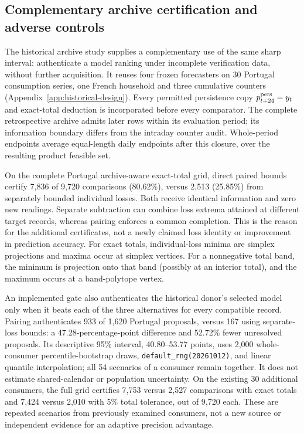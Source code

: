 \subsection{Complementary archive certification and adverse controls}
\label{sec:historical-application}
The historical archive study supplies a complementary use of the same
sharp interval: authenticate a model ranking under incomplete verification
data, without further acquisition. It reuses four frozen forecasters on
30 Portugal consumption series, one French household and three cumulative
counters (Appendix~\ref{app:historical-design}). Every permitted persistence
copy $p^{\rm pers}_{t+24}=y_t$ and exact-total deduction is incorporated
before every comparator. The complete retrospective archive admits later
rows within its evaluation period; its information boundary differs from
the intraday counter audit. Whole-period endpoints average equal-length
daily endpoints after this closure, over the resulting product feasible set.

On the complete Portugal archive-aware exact-total grid, direct paired
bounds certify 7,836 of 9,720 comparisons (80.62\%), versus 2,513
(25.85\%) from separately bounded individual losses. Both receive identical
information and zero new readings. Separate subtraction can combine loss
extrema attained at different target records, whereas pairing enforces a
common completion. This is the reason for the additional certificates,
not a newly claimed loss identity or improvement in prediction accuracy.
For exact totals, individual-loss minima are simplex projections and maxima
occur at simplex vertices. For a nonnegative total band, the minimum is
projection onto that band (possibly at an interior total), and the maximum
occurs at a band-polytope vertex.

An implemented gate also authenticates the historical donor's selected
model only when it beats each of the three alternatives for every compatible
record. Pairing authenticates 933 of 1,620 Portugal proposals, versus 167
using separate-loss bounds: a 47.28-percentage-point difference and
52.72\% fewer unresolved proposals. Its descriptive 95\% interval,
40.80--53.77 points, uses 2,000 whole-consumer percentile-bootstrap draws,
\texttt{default\_rng(20261012)}, and linear quantile interpolation; all
54 scenarios of a consumer remain together. It does not estimate
shared-calendar or population uncertainty. On the existing 30 additional
consumers, the full grid certifies 7,753 versus 2,527 comparisons with exact
totals and 7,424 versus 2,010 with 5\% total tolerance, out of 9,720 each.
These are repeated scenarios from previously examined consumers, not a new
source or independent evidence for an adaptive precision advantage.

